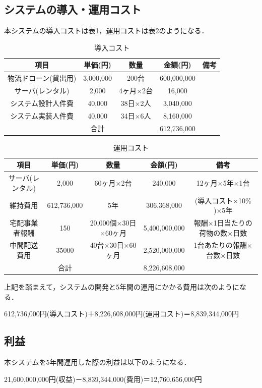 \documentclass[a4paper, titlepage]{jsarticle}
\begin{document}
\subsection{システムの導入・運用コスト}
本システムの導入コストは表1，運用コストは表2のようになる．
\begin{table}[htbp]
    \centering
    \begin{tabular}{c c c c c}
    \hline
    項目 & 単価(円) & 数量 & 金額(円) & 備考 \\
    \hline \hline
    物流ドローン(貸出用) & 3,000,000 & 200台 & 600,000,000 &  \\
    サーバ(レンタル) & 2,000 & 4ヶ月×2台 & 16,000 & \\
    システム設計人件費 & 40,000 & 38日×2人 & 3,040,000 & \\
    システム実装人件費 & 40,000 & 34日×6人 & 8,160,000 & \\
    \hline \hline
     & 合計 &  & 612,736,000 &  \\
    \hline
    \end{tabular}
    \caption{導入コスト}
    \label{tab:label1}
\end{table}

\begin{table}[htbp]
    \centering
    \begin{tabular}{c c c c c}
    \hline
    項目 & 単価(円) & 数量 & 金額(円) & 備考 \\
    \hline \hline
    サーバ(レンタル) & 2,000 & 60ヶ月×2台 & 240,000 & 12ヶ月×5年×1台 \\
    維持費用 & 612,736,000 & 5年 & 306,368,000 & (導入コスト×10\% )×5年 \\
    宅配事業者報酬 & 150 & 20,000個×30日×60ヶ月 & 5,400,000,000 & 報酬×1日当たりの荷物の数×日数 \\
    中間配送費用 & 35000 & 40台×30日×60ヶ月 & 2,520,000,000 & 1台あたりの報酬×台数×日数 \\
    \hline \hline
     & 合計 &  & 8,226,608,000 &  \\
    \hline
    \end{tabular}
    \caption{運用コスト}
    \label{tab:label2}
\end{table}

上記を踏まえて，システムの開発と5年間の運用にかかる費用は次のようになる．
\begin{center}
    612,736,000円(導入コスト)＋8,226,608,000円(運用コスト)＝8,839,344,000円
\end{center}

\subsection{利益}
本システムを5年間運用した際の利益は以下のようになる．
\begin{center}
    21,600,000,000円(収益)－8,839,344,000(費用)＝12,760,656,000円
\end{center}
\end{document}

